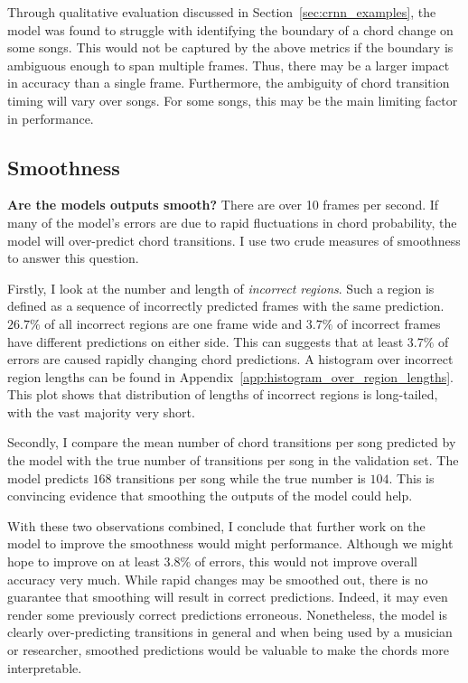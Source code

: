 Through qualitative evaluation discussed in Section~\ref{sec:crnn_examples}, the model was found to struggle with identifying the boundary of a chord change on some songs. This would not be captured by the above metrics if the boundary is ambiguous enough to span multiple frames. Thus, there may be a larger impact in accuracy than a single frame. Furthermore, the ambiguity of chord transition timing will vary over songs. For some songs, this may be the main limiting factor in performance.

\subsection{Smoothness}\label{sec:smoothness}

\textbf{Are the models outputs smooth?} There are over 10 frames per second. If many of the model's errors are due to rapid fluctuations in chord probability, the model will over-predict chord transitions. I use two crude measures of smoothness to answer this question.

Firstly, I look at the number and length of \emph{incorrect regions}. Such a region is defined as a sequence of incorrectly predicted frames with the same prediction. $26.7\%$ of all incorrect regions are one frame wide and $3.7\%$ of incorrect frames have different predictions on either side. This can suggests that at least $3.7\%$ of errors are caused rapidly changing chord predictions. A histogram over incorrect region lengths can be found in Appendix~\ref{app:histogram_over_region_lengths}. This plot shows that distribution of lengths of incorrect regions is long-tailed, with the vast majority very short.

Secondly, I compare the mean number of chord transitions per song predicted by the model with the true number of transitions per song in the validation set. The model predicts $168$ transitions per song while the true number is $104$. This is convincing evidence that smoothing the outputs of the model could help. 

With these two observations combined, I conclude that further work on the model to improve the smoothness would might performance. Although we might hope to improve on at least $3.8\%$ of errors, this would not improve overall accuracy very much. While rapid changes may be smoothed out, there is no guarantee that smoothing will result in correct predictions. Indeed, it may even render some previously correct predictions erroneous. Nonetheless, the model is clearly over-predicting transitions in general and when being used by a musician or researcher, smoothed predictions would be valuable to make the chords more interpretable.

